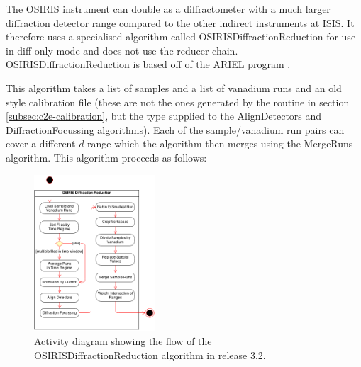 \documentclass[paper=a4, fontsize=11pt]{scrartcl}	%
\numberwithin{equation}{section}															%
\numberwithin{figure}{section}																%
\numberwithin{table}{section}																%
\begin{document}
The OSIRIS instrument can double as a diffractometer with a much larger diffraction detector range compared to the other indirect instruments at ISIS. It therefore uses a specialised algorithm called OSIRISDiffractionReduction for use in diff only mode and does not use the reducer chain. OSIRISDiffractionReduction is based off of the ARIEL program \citep{pradaelli2000ariel}. 

This algorithm takes a list of samples and a list of vanadium runs and an old style calibration file (these are not the ones generated by the routine in section \ref{subsec:c2e-calibration}, but the type supplied to the AlignDetectors and DiffractionFocussing algorithms). Each of the sample/vanadium run pairs can cover a different $d$-range which the algorithm then merges using the MergeRuns algorithm. This algorithm proceeds as follows:

\begin{figure}[H]
\centering
\includegraphics[width=0.4\textwidth]{img/uml/activity_diagrams/OSIRISDiffractionReduction_activity.png}
\caption{Activity diagram showing the flow of the OSIRISDiffractionReduction algorithm in release 3.2.}
\label{fig:OSIRISdiffraction-class-diagram}
\end{figure}
\end{document}
